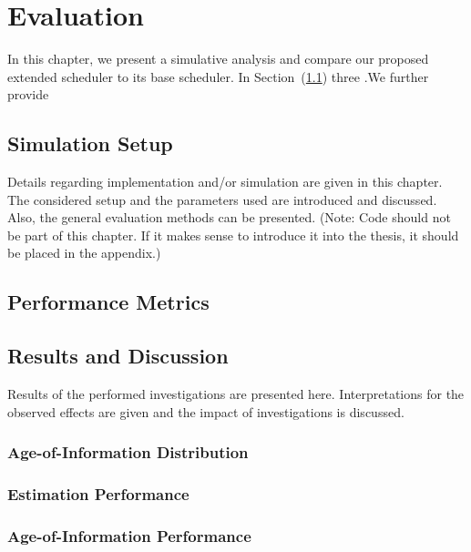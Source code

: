 \chapter{Evaluation}

In this chapter, we present a simulative analysis and compare our proposed
extended scheduler to its base scheduler. In Section~(\ref{sec:setup}) three .We further provide 

\section{Simulation Setup} \label{sec:setup}
Details regarding implementation and/or simulation are given in this chapter.
The considered setup and the parameters used are introduced and discussed. Also,
the general evaluation methods can be presented. (Note: Code should not be part
of this chapter. If it makes sense to introduce it into the thesis, it should be
placed in the appendix.)

\section{Performance Metrics} \label{}

\section{Results and Discussion}
Results of the performed investigations are presented here. Interpretations for
the observed effects are given and the impact of investigations is discussed. 

\subsection{Age-of-Information Distribution}

\subsection{Estimation Performance}

\subsection{Age-of-Information Performance}
